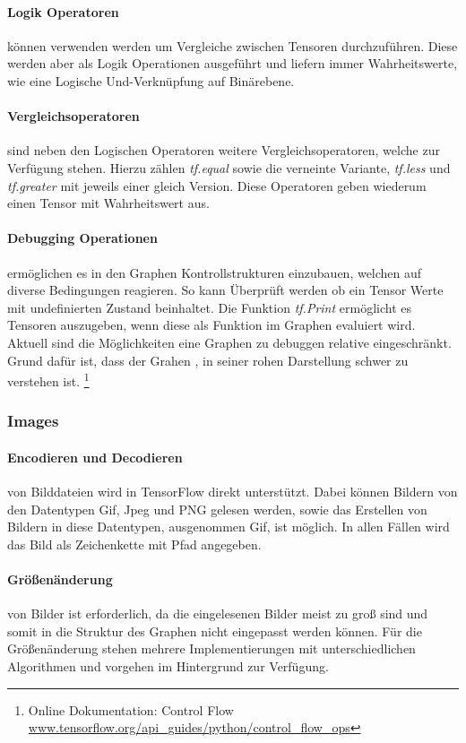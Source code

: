 \paragraph{Logik Operatoren} können verwenden werden um Vergleiche zwischen Tensoren durchzuführen. 
Diese werden aber als Logik Operationen ausgeführt und liefern immer Wahrheitswerte, wie eine Logische Und-Verknüpfung auf Binärebene.

\paragraph{Vergleichsoperatoren} sind neben den Logischen Operatoren weitere Vergleichsoperatoren, welche zur Verfügung stehen. 
Hierzu zählen \textit{tf.equal} sowie die verneinte Variante, \textit{tf.less} und \textit{tf.greater} mit jeweils einer gleich Version. 
Diese Operatoren geben wiederum einen Tensor mit Wahrheitswert aus.

\paragraph{Debugging Operationen} ermöglichen es in den Graphen Kontrollstrukturen einzubauen, welchen auf diverse Bedingungen reagieren.
So kann Überprüft werden ob ein Tensor Werte mit undefinierten Zustand beinhaltet. 
Die Funktion \textit{tf.Print} ermöglicht es Tensoren auszugeben, wenn diese als Funktion im Graphen evaluiert wird. 
Aktuell sind die Möglichkeiten eine Graphen zu debuggen relative eingeschränkt. Grund dafür ist, dass der Grahen , in seiner rohen Darstellung schwer zu verstehen ist. \footnote{Online Dokumentation: Control Flow \url{www.tensorflow.org/api_guides/python/control_flow_ops}}

\subsubsection{Images}

\paragraph{Encodieren und Decodieren} von Bilddateien wird in TensorFlow direkt unterstützt.
Dabei können Bildern von den Datentypen Gif, Jpeg und PNG gelesen werden, sowie das Erstellen von Bildern in diese Datentypen, ausgenommen Gif, ist möglich.
In allen Fällen wird das Bild als Zeichenkette mit Pfad angegeben. 

\paragraph{Größenänderung} von Bilder ist erforderlich, da die eingelesenen Bilder meist zu groß sind und somit in die Struktur des Graphen nicht eingepasst werden können. 
Für die Größenänderung stehen mehrere Implementierungen mit unterschiedlichen Algorithmen und vorgehen im Hintergrund zur Verfügung.


